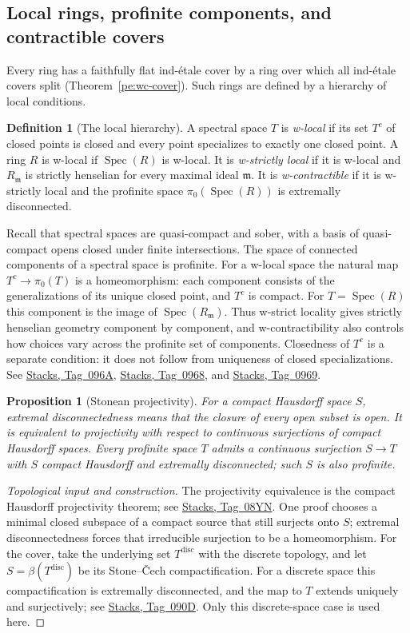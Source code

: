 \documentclass[11pt,a4paper]{article}
\numberwithin{equation}{section}
\newtheorem{proposition}[theorem]{Proposition}
\theoremstyle{definition}
\newtheorem{definition}[theorem]{Definition}
\theoremstyle{remark}
\newcommand{\stacks}[1]{\href{https://stacks.math.columbia.edu/tag/#1}{\textnormal{Stacks, Tag~#1}}}
\begin{document}
\subsection{Local rings, profinite components, and contractible covers}

Every ring has a faithfully flat ind-\'etale cover by a ring over which
all ind-\'etale covers split (Theorem~\ref{pe:wc-cover}). Such rings are defined by a hierarchy of
local conditions.

\begin{definition}[The local hierarchy]
\label{pe:wlocal}
A spectral space $T$ is \emph{w-local} if its set $T^c$ of closed
points is closed and every point specializes to exactly one closed
point. A ring $R$ is w-local if $\operatorname{Spec}(R)$ is w-local.
It is \emph{w-strictly local} if it is w-local and
$R_{\mathfrak m}$ is strictly henselian for every maximal ideal
$\mathfrak m$. It is \emph{w-contractible} if it is w-strictly local
and the profinite space $\pi_0(\operatorname{Spec}(R))$ is
extremally disconnected.
\end{definition}

Recall that spectral spaces are quasi-compact and sober, with a basis
of quasi-compact opens closed under finite intersections. The space of
connected components of a spectral space is profinite. For a w-local
space the natural map
$T^c\to\pi_0(T)$ is a homeomorphism: each component consists of the
generalizations of its unique closed point, and $T^c$ is compact.
For $T=\operatorname{Spec}(R)$ this component is the image of
$\operatorname{Spec}(R_{\mathfrak m})$.
Thus w-strict locality gives strictly henselian geometry component by
component, and w-contractibility also controls how choices vary across
the profinite set of components. Closedness of $T^c$ is a separate
condition: it does not follow from uniqueness of closed
specializations. See \stacks{096A}, \stacks{0968}, and \stacks{0969}.

\begin{proposition}[Stonean projectivity]
\label{pe:stonean}
For a compact Hausdorff space $S$, extremal disconnectedness means that
the closure of every open subset is open. It is equivalent to
projectivity with respect to continuous surjections of compact
Hausdorff spaces. Every profinite space $T$ admits a continuous
surjection $S\to T$ with $S$ compact Hausdorff and extremally
disconnected; such $S$ is also profinite.
\end{proposition}
\begin{proof}[Topological input and construction]
The projectivity equivalence is the compact Hausdorff projectivity
theorem; see \stacks{08YN}. One proof chooses a minimal closed subspace
of a compact source that still surjects onto $S$; extremal
disconnectedness forces that irreducible surjection to be a
homeomorphism. For the cover, take the underlying set $T^{\mathrm{disc}}$
with the discrete topology, and let
$S=\beta(T^{\mathrm{disc}})$ be its Stone--\v{C}ech compactification.
For a discrete space this compactification is extremally disconnected,
and the map to $T$ extends uniquely and surjectively; see
\stacks{090D}. Only this discrete-space case is used here.
\end{proof}
\end{document}
